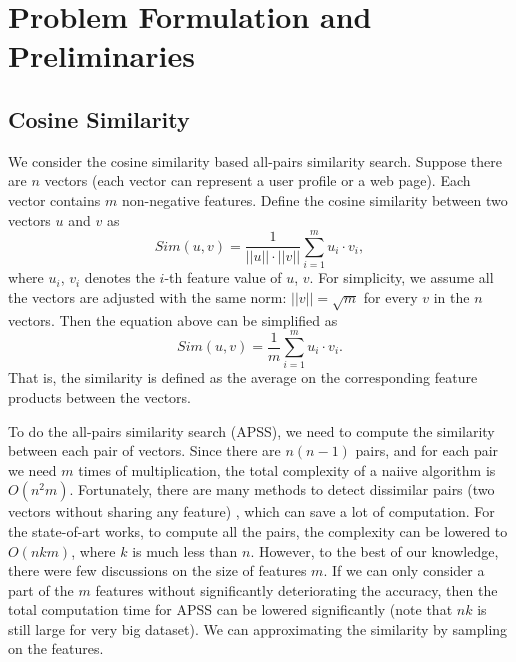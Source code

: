\documentclass{article}
\begin{document}
\section{Problem Formulation and Preliminaries}
\label{sec:pp}
\subsection{Cosine Similarity}
We consider the cosine similarity based all-pairs similarity search.
Suppose there are $n$ vectors (each vector can represent a user profile or a web page). Each vector contains $m$ non-negative features. Define the cosine similarity between two vectors $u$ and $v$ as
$$Sim(u,v) = \frac{1}{||u||\cdot||v||} \sum_{i=1}^m u_i\cdot v_i,$$
where $u_i$, $v_i$ denotes the $i$-th feature value of $u$, $v$.
For simplicity, we assume all the vectors are adjusted with the same norm: $||v|| = \sqrt{m}$ for every $v$ in the $n$ vectors. Then the equation above can be simplified as
$$Sim(u,v) = \frac{1}{m} \sum_{i=1}^m u_i\cdot v_i.$$
That is, the similarity is defined as the average on the corresponding feature products between the vectors. 

To do the all-pairs similarity search (APSS), we need to compute the similarity between each pair of vectors. Since there are $n(n-1)$ pairs, and for each pair we need $m$ times of multiplication, the total complexity of a naiive algorithm is $O(n^2 m)$. Fortunately, there are many methods to detect dissimilar pairs (two vectors without sharing any feature) \cite{ATY13,TAJY14,Lin09}, which can save a lot of computation. For the state-of-art works, to compute all the pairs, the complexity can be lowered to $O(nkm)$, where $k$ is much less than $n$. However, to the best of our knowledge, there were few discussions on the size of features $m$. If we can only consider a part of the $m$ features without significantly deteriorating the accuracy, then the total computation time for APSS can be lowered significantly (note that $nk$ is still large for very big dataset). We can approximating the similarity by sampling on the features.
\end{document}
